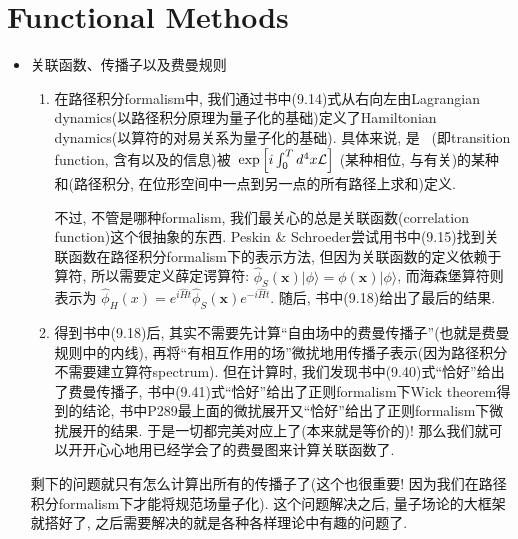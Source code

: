 \chapter{Functional Methods}

\begin{itemize}
  \item 关联函数、传播子以及费曼规则
        \begin{enumerate}
          \item 在路径积分formalism中, 我们通过书中(9.14)式从右向左由Lagrangian dynamics(以路径积分原理为量子化的基础)定义了Hamiltonian dynamics(以算符的对易关系为量子化的基础).
                具体来说, 是\ {} (即transition function, 含有以及的信息)被\ {\color{OliveGreen}$\exp{\Bigl[i\int_0^T d^4 x \mathcal{L}}\Bigr]$} (某种相位, 与有关)的{\color{OliveGreen}某种和}(路径积分, 在位形空间中一点到另一点的所有路径上求和)定义.

                  不过, 不管是哪种formalism, 我们最关心的总是关联函数(correlation function)这个很抽象的东西.
                  Peskin \& Schroeder尝试用书中(9.15)找到关联函数在路径积分formalism下的表示方法, 但因为关联函数的定义依赖于算符, 所以需要定义薛定谔算符: $\hat{\phi}_S(\mathbf{x})|\phi\rangle = \phi(\mathbf{x})|\phi\rangle$, 而海森堡算符则表示为 $\hat{\phi}_H(x) = e^{i\hat{H}t}\hat{\phi}_S(\mathbf{x}) e^{-i\hat{H}t}$.
                  随后, 书中(9.18)给出了最后的结果.

          \item 得到书中(9.18)后, 其实不需要先计算“自由场中的费曼传播子”(也就是费曼规则中的内线), 再将“有相互作用的场”微扰地用传播子表示(因为路径积分不需要建立算符spectrum).
                但在计算时, 我们发现书中(9.40)式“恰好”给出了费曼传播子, 书中(9.41)式“恰好”给出了正则formalism下Wick theorem得到的结论, 书中P289最上面的微扰展开又“恰好”给出了正则formalism下微扰展开的结果.
                于是一切都完美对应上了(本来就是等价的)!
                那么我们就可以开开心心地用已经学会了的费曼图来计算关联函数了.
        \end{enumerate}

        剩下的问题就只有怎么计算出所有的传播子了(这个也很重要! 因为我们在路径积分formalism下才能将规范场量子化).
        这个问题解决之后, 量子场论的大框架就搭好了, 之后需要解决的就是各种各样理论中有趣的问题了.

        \clearpage


\end{itemize}
